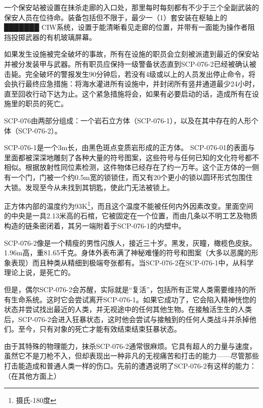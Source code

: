 一个保安站被设置在抹杀走廊的入口处，那里每时每刻都有不少于三个全副武装的保安人员在位待命。装备包括但不限于，最少一（1）套安装在枢轴上的███████ CIW系统，设置于能清晰看见走廊的位置，并带有一面能为操作者阻挡投掷武器的有机玻璃屏幕。

如果发生设施被完全破坏的事故，所有在设施的职员会立刻被派遣到最近的保安站并被分发装甲与武器。所有职员应保持一级警备状态直到SCP-076-2已经被确认被击毙。完全破坏的警报发生90分钟后，若没有4级或以上的人员发出停止命令，将会执行最终应急措施：将海水灌进所有设施中，并封闭所有竖井通道最少24小时，直至回收行动下达为止。这个紧急措施将会，如果有必要启动的话，造成所有在设施里的职员的死亡。

\hr

SCP-076由两部分组成：一个岩石立方体（SCP-076-1），以及在其中存在的人形个体（SCP-076-2）。

SCP-076-1是一个3m长，由黑色斑点变质岩形成的正方体。 SCP-076-01的表面与里面都被深深地雕刻了各种大量的符号图案，这些符号与任何已知的文化符号都不相似。根据放射性同位素检测，这件物体已经存在了约一万年。这个正方体的一侧有一个门，门被一个约0.5m宽的锁锁住，而又有20个更小的锁以圆环形式包围住大锁。发现至今从未找到其钥匙，使此门无法被锁上。

正方体内部的温度约为93K\footnote{摄氏-180度}，而且这个温度不能被任何内外因素改变。里面空间的中央是一具2.13米高的石棺，它被固定在一个位置，而由几条以不明工艺及物质构造的链条密闭着，其另一端附着于SCP-076-1的内壁中。

SCP-076-2像是一个精瘦的男性闪族人，接近三十岁。黑发，灰瞳，橄榄色皮肤。 1.96m高，重81.65千克。身体外表布满了神秘难懂的符号和图案（大多以恶魔的形象表现）而且种类从精细到极端夸张都有。当SCP-076-2在SCP-076-1中，从科学理论上说，是死亡的。

但是，偶尔SCP-076-2会苏醒，实际就是“复活”，包括所有正常人类需要维持的所有生命系统。这时它会尝试离开SCP-076-1。如果它成功了，它会陷入精神恍惚的状态并尝试找出最近的人类，并无视途中的任何其他生物。在接触活生生的人类后，SCP-076-2会进入狂暴状态，这时他会尝试与接触到的任何人类战斗并杀掉他们。至今，只有对象的死亡才能有效结束结束狂暴状态。

由于其特殊的物理能力，抹杀SCP-076-2通常很麻烦。它具有超人的力量与速度，虽然它不是刀枪不入，但却表现出一种非凡的无视痛苦和打击的能力——尽管那些打击能造成和普通人类一样的伤口。先前的遭遇说明了SCP-076-2有这样的能力：（在其他方面上）


